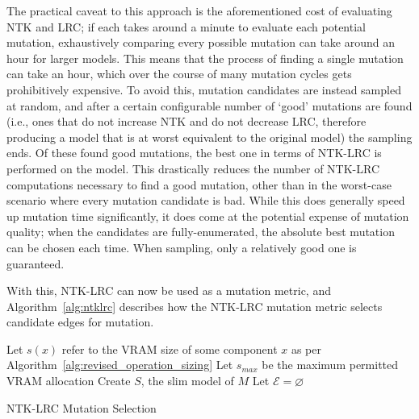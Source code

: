 The practical caveat to this approach is the aforementioned cost of evaluating NTK and LRC; if each takes around a
minute to evaluate each potential mutation, exhaustively comparing every possible mutation can take around an hour for
larger models. This means that the process of finding a single mutation can take an hour, which over the course of many
mutation cycles gets prohibitively expensive. To avoid this, mutation candidates are instead sampled at random, and after
a certain configurable number of `good' mutations are found (i.e., ones that do not increase NTK and do not decrease LRC,
therefore producing a model that is at worst equivalent to the original model) the sampling ends. Of these found
good mutations, the best one in terms of NTK-LRC is performed on the model. This drastically reduces the number
of NTK-LRC computations necessary to find a good mutation, other than in the worst-case scenario where every mutation candidate
is bad. While this does generally speed up mutation time significantly, it does
come at the potential expense of mutation quality; when the candidates are fully-enumerated, the absolute best mutation can be
chosen each time. When sampling, only a relatively good one is guaranteed.

With this, NTK-LRC can now be used as a mutation metric, and Algorithm~\ref{alg:ntklrc} describes how the NTK-LRC mutation
metric selects candidate edges for mutation.

\begin{algorithm}[ht]
\SetAlgoLined
{}
Let $s(x)$ refer to the VRAM size of some component $x$ as per Algorithm~\ref{alg:revised_operation_sizing}\;
Let $s_{max}$ be the maximum permitted VRAM allocation\;
 Create $S$, the slim model of $M$\;
Let $\mathcal{E}=\varnothing$\;
\Output{$\varnothing$}
\caption{NTK-LRC Mutation Selection}
\label{alg:ntklrc}
\end{algorithm}

